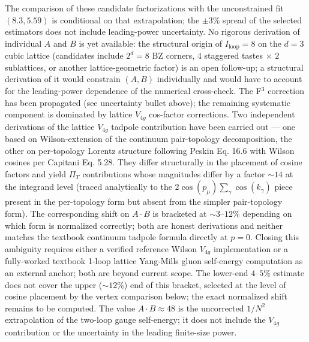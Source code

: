 \documentclass[
]{article}
\begin{document}
The comparison of these candidate factorizations with the unconstrained
fit \((8.3, 5.59)\) is conditional on that extrapolation; the
\(\pm 3\%\) spread of the selected estimators does not include
leading-power uncertainty. No rigorous derivation of individual \(A\)
and \(B\) is yet available: the structural origin of
\(I_{\text{loop}} = 8\) on the \(d = 3\) cubic lattice (candidates
include \(2^d = 8\) BZ corners, \(4\) staggered tastes \(\times\) \(2\)
sublattices, or another lattice-geometric factor) is an open follow-up;
a structural derivation of it would constrain \((A, B)\) individually
and would have to account for the leading-power dependence of the
numerical cross-check. The F\(^3\) correction has been propagated (see
uncertainty bullet above); the remaining systematic component is
dominated by lattice \(V_{4g}\) cos-factor corrections. Two independent
derivations of the lattice \(V_{4g}\) tadpole contribution have been
carried out --- one based on Wilson-extension of the continuum
pair-topology decomposition, the other on per-topology Lorentz structure
following Peskin Eq. 16.6 with Wilson cosines per Capitani Eq. 5.28.
They differ structurally in the placement of cosine factors and yield
\(\Pi_T\) contributions whose magnitudes differ by a factor \(\sim 14\)
at the integrand level (traced analytically to the
\(2 \cos(p_\mu) \sum_\gamma \cos(k_\gamma)\) piece present in the
per-topology form but absent from the simpler pair-topology form). The
corresponding shift on \(A \cdot B\) is bracketed at
\(\sim 3\)--\(12\%\) depending on which form is normalized correctly;
both are honest derivations and neither matches the textbook continuum
tadpole formula directly at \(p = 0\). Closing this ambiguity requires
either a verified reference Wilson \(V_{4g}\) implementation or a
fully-worked textbook 1-loop lattice Yang-Mills gluon self-energy
computation as an external anchor; both are beyond current scope. The
lower-end \(4\)--\(5\%\) estimate does not cover the upper
(\(\sim 12\%\)) end of this bracket, selected at the level of cosine
placement by the vertex comparison below; the exact normalized shift
remains to be computed. The value \(A \cdot B \approx 48\) is the
uncorrected \(1/N^2\) extrapolation of the two-loop gauge self-energy;
it does not include the \(V_{4g}\) contribution or the uncertainty in
the leading finite-size power.
\end{document}
